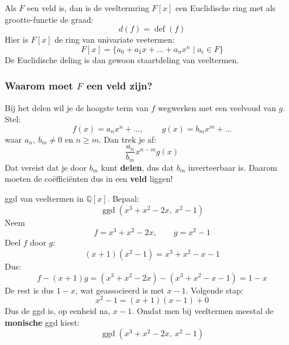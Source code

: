 Als $F$ een veld is, dan is de veeltermring $F[x]$ een Euclidische ring met als grootte-functie de graad:
\begin{equation*}
    d(f) = \operatorname{def}(f)
\end{equation*}
Hier is $F[x]$ de ring van univariate veetermen:
\begin{equation*}
    F[x] = \{a_0 + a_1x + \dots + a_nx^n \mid a_i \in F\}
\end{equation*}
De Euclidische deling is dan gewoon staartdeling van veeltermen.

\subsubsection{Waarom moet \texorpdfstring{$F$}{F} een veld zijn?}

Bij het delen wil je de hoogste term van $f$ wegwerken met een veelvoud van $g$. Stel:
\begin{equation*}
    f(x) = a_nx^n + \dots,\ \qquad g(x) = b_mx^m + \dots
\end{equation*}
waar $a_n,\ b_m \neq 0$ en $ n \ge m$. Dan trek je af:
\begin{equation*}
    \frac{a_n}{b_m}x^{n-m}g(x)
\end{equation*}
Dat vereist dat je door $b_m$ kunt \textbf{delen}, dus dat $b_m$ inverteerbaar is. Daarom moeten de coëfficiënten dus in een \textbf{veld} liggen!

\textbf{} ggd van veeltermen in $\mathbb{Q}[x]$.\newline
Bepaal:
\begin{equation*}
    \operatorname{ggd}(x^3 + x^2 - 2x,\ x^2 - 1)
\end{equation*}
 Neem
\begin{equation*}
    f = x^3 + x^2 - 2x, \qquad g = x^2 - 1 
\end{equation*}
Deel $f$ door $g$:
\begin{equation*}
    (x+1)(x^2-1) = x^3 + x^2 - x - 1
\end{equation*}
Dus:
\begin{equation*}
    f - (x+1)g = (x^3 + x^2 - 2x) - (x^3 + x^2 - x - 1) = 1 - x
\end{equation*}
De rest is dus $1-x$, wat geassocieerd is met $x-1$. Volgende stap:
\begin{equation*}
    x^2 - 1 = (x+1)(x-1) + 0
\end{equation*}
Dus de ggd is, op eenheid na, $x-1$. Omdat men bij veeltermen meestal de \textbf{monische} ggd kiest:
\begin{equation*}
    \operatorname{ggd}(x^3 + x^2 - 2x,\ x^2 - 1)
\end{equation*}

